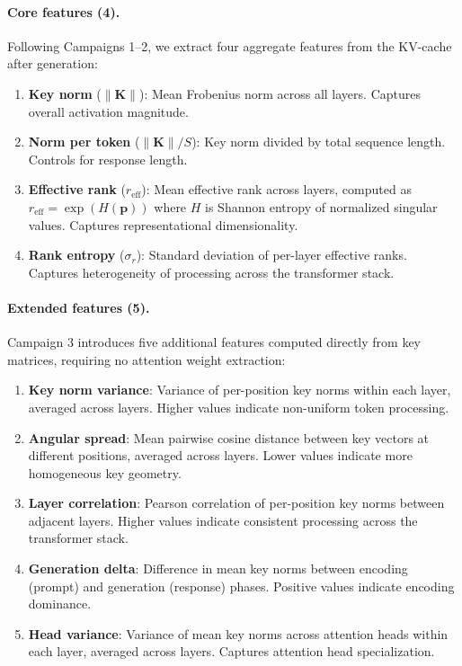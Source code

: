\paragraph{Core features (4).} Following Campaigns 1--2, we extract four aggregate features from the KV-cache after generation:

\begin{enumerate}[leftmargin=*]
    \item \textbf{Key norm} ($\|\mathbf{K}\|$): Mean Frobenius norm across all layers. Captures overall activation magnitude.
    \item \textbf{Norm per token} ($\|\mathbf{K}\| / S$): Key norm divided by total sequence length. Controls for response length.
    \item \textbf{Effective rank} ($r_{\text{eff}}$): Mean effective rank across layers, computed as $r_{\text{eff}} = \exp(H(\mathbf{p}))$ where $H$ is Shannon entropy of normalized singular values. Captures representational dimensionality.
    \item \textbf{Rank entropy} ($\sigma_r$): Standard deviation of per-layer effective ranks. Captures heterogeneity of processing across the transformer stack.
\end{enumerate}

\paragraph{Extended features (5).} Campaign 3 introduces five additional features computed directly from key matrices, requiring no attention weight extraction:

\begin{enumerate}[leftmargin=*,start=5]
    \item \textbf{Key norm variance}: Variance of per-position key norms within each layer, averaged across layers. Higher values indicate non-uniform token processing.
    \item \textbf{Angular spread}: Mean pairwise cosine distance between key vectors at different positions, averaged across layers. Lower values indicate more homogeneous key geometry.
    \item \textbf{Layer correlation}: Pearson correlation of per-position key norms between adjacent layers. Higher values indicate consistent processing across the transformer stack.
    \item \textbf{Generation delta}: Difference in mean key norms between encoding (prompt) and generation (response) phases. Positive values indicate encoding dominance.
    \item \textbf{Head variance}: Variance of mean key norms across attention heads within each layer, averaged across layers. Captures attention head specialization.
\end{enumerate}

